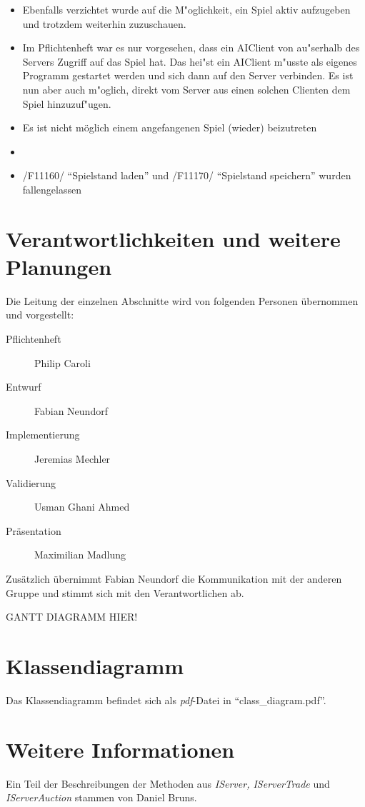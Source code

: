 \documentclass[a4paper,10pt]{article}
\begin{document}
\begin{itemize}
\item Ebenfalls verzichtet wurde auf die M"oglichkeit, ein Spiel aktiv aufzugeben und trotzdem weiterhin zuzuschauen.
\item Im Pflichtenheft war es nur vorgesehen, dass ein AIClient von au"serhalb des Servers Zugriff auf das Spiel hat. Das hei"st ein AIClient m"usste als eigenes Programm gestartet werden und sich dann auf den Server verbinden. Es ist nun aber auch m"oglich, direkt vom Server aus einen solchen Clienten dem Spiel hinzuzuf"ugen.
\item Es ist nicht möglich einem angefangenen Spiel (wieder) beizutreten
\item 
\item /F11160/ "`Spielstand laden"' und /F11170/ "`Spielstand speichern"' wurden fallengelassen 
\end{itemize}
\section{Verantwortlichkeiten und weitere Planungen}
Die Leitung der einzelnen Abschnitte wird von folgenden Personen übernommen und vorgestellt:
\begin{description}
\item[Pflichtenheft] Philip Caroli
\item[Entwurf] Fabian Neundorf
\item[Implementierung] Jeremias Mechler
\item[Validierung] Usman Ghani Ahmed
\item[Präsentation] Maximilian Madlung
\end{description}
Zusätzlich übernimmt Fabian Neundorf die Kommunikation mit der anderen Gruppe und stimmt sich mit den Verantwortlichen ab.

GANTT DIAGRAMM HIER!
\section{Klassendiagramm}
Das Klassendiagramm befindet sich als \textit{pdf}-Datei in "`class\_diagram.pdf"'.
\section{Weitere Informationen}
Ein Teil der Beschreibungen der Methoden aus \textit{IServer, IServerTrade} und \textit{IServerAuction} stammen von Daniel Bruns.
\end{document}
